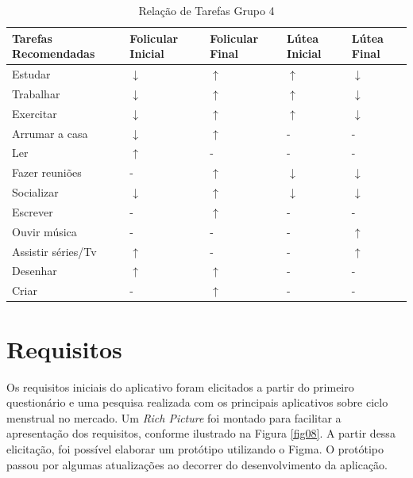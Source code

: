 \begin{table}[htbp]
    \centering
    \caption{Relação de Tarefas Grupo 4}
    \label{tab14}
    \begin{tabular}{p{5cm}p{1.8cm}p{1.8cm}p{1.8cm}p{1.8cm}}
        \toprule
        \textbf{Tarefas Recomendadas}  & \textbf{Folicular Inicial} & \textbf{Folicular Final}  & \textbf{Lútea Inicial}& \textbf{Lútea Final} \\ 
        \midrule
    Estudar & $\downarrow$  & $\uparrow$ & $\uparrow$ & $\downarrow$ \\ 
    \midrule
    Trabalhar & $\downarrow$ & $\uparrow$  & $\uparrow$ &  $\downarrow$  \\ 
    \midrule
    Exercitar & $\downarrow$ & $\uparrow$ & $\uparrow$ &  $\downarrow$  \\ 
    \midrule
    Arrumar a casa  & $\downarrow$ & $\uparrow$  & - & - \\ 
    \midrule
    Ler & $\uparrow$ & -  & - & - \\ 
    \midrule
    Fazer reuniões & - & $\uparrow$ & $\downarrow$ & $\downarrow$ \\ 
    \midrule
    Socializar & $\downarrow$ & $\uparrow$  & $\downarrow$ & $\downarrow$ \\ 
    \midrule
    Escrever & - & $\uparrow$  & - & - \\ 
    \midrule
    Ouvir música & - & - & - & $\uparrow$ \\ 
    \midrule
    Assistir séries/Tv & $\uparrow$ & - & - & $\uparrow$ \\ 
    \midrule
    Desenhar & $\uparrow$ & $\uparrow$  & - & - \\ 
    \midrule
    Criar & - & $\uparrow$  & - & - \\ 
    \bottomrule    
    \end{tabular}
    \end{table}

\newpage 
\section{Requisitos}
\label{req}

Os requisitos iniciais do aplicativo foram elicitados a partir do primeiro questionário e uma pesquisa realizada 
com os principais aplicativos sobre ciclo menstrual no mercado.  
Um \emph{Rich Picture} foi montado para facilitar a apresentação dos requisitos, conforme ilustrado na Figura \ref{fig08}.
A partir dessa elicitação, foi possível elaborar um protótipo utilizando o Figma. O protótipo passou por 
algumas atualizações ao decorrer do desenvolvimento da aplicação.

